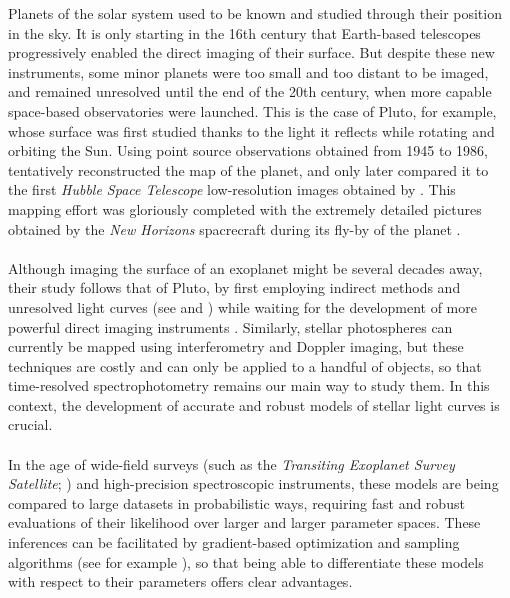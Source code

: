 \documentclass[modern]{aastex631}
\begin{document}
Planets of the solar system used to be known and studied through their position in the sky. It is only starting in the 16th century that Earth-based telescopes progressively enabled the direct imaging of their surface. But despite these new instruments, some minor planets were too small and too distant to be imaged, and remained unresolved until the end of the 20th century, when more capable space-based observatories were launched. This is the case of Pluto, for example, whose surface was first studied thanks to the light it reflects while rotating and orbiting the Sun. Using point source observations obtained from 1945 to 1986, \cite{Drish1995} tentatively reconstructed the map of the planet, and only later compared it to the first \textit{Hubble Space Telescope} low-resolution images obtained by \cite{Stern1997}. This mapping effort was gloriously completed with the extremely detailed pictures obtained by the \textit{New Horizons} spacrecraft during its fly-by of the planet \citep{Stern2015}.\\\\
Although imaging the surface of an exoplanet might be several decades away, their study follows that of Pluto, by first employing indirect methods and unresolved light curves (see \citealt{Mayor1995} and \citealt{Charbonneau2000})  while waiting for the development of more powerful direct imaging instruments \cite{}. Similarly, stellar photospheres can currently be mapped using interferometry and Doppler imaging, but these techniques are costly and can only be applied to a handful of objects, so that time-resolved spectrophotometry remains our main way to study them. In this context, the development of accurate and robust models of stellar light curves is crucial.\\\\
In the age of wide-field surveys (such as the \textit{Transiting Exoplanet Survey Satellite}; \citealt{tess}) and high-precision spectroscopic instruments, these models are being compared to large datasets in probabilistic ways, requiring fast and robust evaluations of their likelihood over larger and larger parameter spaces. These inferences can be facilitated by gradient-based optimization and sampling algorithms (see for example \citealt{Betancourt2017}), so that being able to differentiate these models with respect to their parameters offers clear advantages.\\\\
\end{document}
